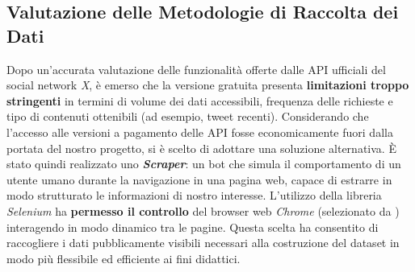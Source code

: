 \documentclass[a4paper,12pt]{article}
\begin{document}
\subsection{Valutazione delle Metodologie di Raccolta dei Dati}
Dopo un'accurata valutazione delle funzionalità offerte dalle API ufficiali del social network \textit{X}, è emerso che la versione gratuita presenta \textbf{limitazioni troppo stringenti} in termini di volume dei dati accessibili, frequenza delle richieste e tipo di contenuti ottenibili (ad esempio, tweet recenti). Considerando che l’accesso alle versioni a pagamento delle API fosse economicamente fuori dalla portata del nostro progetto, si è scelto di adottare una soluzione alternativa. È stato quindi realizzato uno \textit{\textbf{Scraper}}: un bot che simula il comportamento di un utente umano durante la navigazione in una pagina web, capace di estrarre in modo strutturato le informazioni di nostro interesse. L'utilizzo della libreria \textit{Selenium} \cite{selenium} ha \textbf{permesso il controllo} del browser web \textit{Chrome} (selezionato da \cite{browser_supportati}) interagendo in modo dinamico tra le pagine. Questa scelta ha consentito di raccogliere i dati pubblicamente visibili necessari alla costruzione del dataset in modo più flessibile ed efficiente ai fini didattici.
\end{document}
